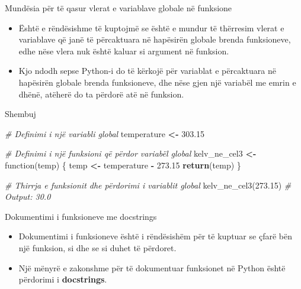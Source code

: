 \documentclass[
  ignorenonframetext,
]{beamer}
\newenvironment{Shaded}{\begin{snugshade}}{\end{snugshade}}
\newcommand{\CommentTok}[1]{\textcolor[rgb]{0.56,0.35,0.01}{\textit{#1}}}
\newcommand{\ControlFlowTok}[1]{\textcolor[rgb]{0.13,0.29,0.53}{\textbf{#1}}}
\newcommand{\FloatTok}[1]{\textcolor[rgb]{0.00,0.00,0.81}{#1}}
\newcommand{\NormalTok}[1]{#1}
\newcommand{\OperatorTok}[1]{\textcolor[rgb]{0.81,0.36,0.00}{\textbf{#1}}}
\begin{document}
\begin{frame}[fragile]{Mundësia për të qasur vlerat e variablave globale
në funksione}
\protect\hypertarget{munduxebsia-puxebr-tuxeb-qasur-vlerat-e-variablave-globale-nuxeb-funksione}{}
\begin{itemize}
\item
  Është e rëndësishme të kuptojmë se është e mundur të thërresim vlerat
  e variablave që janë të përcaktuara në hapësirën globale brenda
  funksioneve, edhe nëse vlera nuk është kaluar si argument në funksion.
\item
  Kjo ndodh sepse Python-i do të kërkojë për variablat e përcaktuara në
  hapësirën globale brenda funksioneve, dhe nëse gjen një variabël me
  emrin e dhënë, atëherë do ta përdorë atë në funksion.
\end{itemize}

\begin{block}{Shembuj}
\protect\hypertarget{shembuj}{}
\begin{Shaded}
\begin{Highlighting}[]
\CommentTok{\# Definimi i një variabli global}
\NormalTok{temperature }\OperatorTok{\textless{}{-}} \FloatTok{303.15}

\CommentTok{\# Definimi i një funksioni që përdor variabël global}
\NormalTok{kelv\_ne\_cel3 }\OperatorTok{\textless{}{-}}\NormalTok{ function(temp) \{}
\NormalTok{    temp }\OperatorTok{\textless{}{-}}\NormalTok{ temperature }\OperatorTok{{-}} \FloatTok{273.15}
    \ControlFlowTok{return}\NormalTok{(temp)}
\NormalTok{\}}

\CommentTok{\# Thirrja e funksionit dhe përdorimi i variablit  global}
\NormalTok{kelv\_ne\_cel3(}\FloatTok{273.15}\NormalTok{)  }\CommentTok{\# Output: 30.0}
\end{Highlighting}
\end{Shaded}
\end{block}
\end{frame}

\begin{frame}{Dokumentimi i funksioneve me docstrings}
\protect\hypertarget{dokumentimi-i-funksioneve-me-docstrings}{}
\begin{itemize}
\item
  Dokumentimi i funksioneve është i rëndësishëm për të kuptuar se çfarë
  bën një funksion, si dhe se si duhet të përdoret.
\item
  Një mënyrë e zakonshme për të dokumentuar funksionet në Python është
  përdorimi i \textbf{docstrings}.
\end{itemize}
\end{frame}
\end{document}
